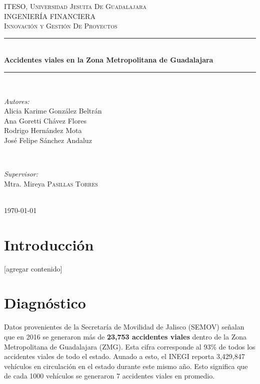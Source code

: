 \documentclass{article}
\begin{document}
\begin{titlepage}
\newcommand{\HRule}{\rule{\linewidth}{0.5mm}}

\center
\textsc{\LARGE ITESO, Universidad Jesuita De Guadalajara}\\[2cm]
\textsc{\Large INGENIERÍA FINANCIERA}\\[1cm]
\textsc{\large Innovación y Gestión De Proyectos}\\[1cm]
\HRule \\[2cm]
{ \huge \bfseries Accidentes viales en la Zona Metropolitana de Guadalajara}\\[2cm]
\HRule \\[2cm]
\begin{minipage}{0.4\textwidth}
\begin{flushleft} \large


\emph{Autores:}\\
\small Alicia Karime González Beltrán\\
\small Ana Goretti Chávez Flores\\
\small Rodrigo Hernández Mota\\
\small José Felipe Sánchez Andaluz
\end{flushleft}
\end{minipage}
~
\begin{minipage}{0.4\textwidth}
\begin{flushright} \large
\emph{Supervisor:} \\
\small Mtra. Mireya \textsc{Pasillas Torres}
\end{flushright}
\end{minipage}\\[2cm]

{\large \today}\\[1cm]

\vfill
 
\end{titlepage}
\tableofcontents
\newpage

\section{Introducción}\label{sec:into}
[agregar contenido]

\newpage
\section{Diagnóstico}\label{sec:diagnostic}

Datos provenientes de la Secretaría de Movilidad de Jalisco (SEMOV) señalan que en 2016 se generaron
más de \textbf{23,753 accidentes viales} dentro de la Zona Metropolitana de
Guadalajara (ZMG). Esta cifra corresponde al 93\% de todos los accidentes
viales de todo el estado. Aunado a esto, el INEGI reporta 3,429,847
vehículos en circulación en el estado durante este mismo año. Esto significa que de cada 1000 vehículos
se generaron 7 accidentes viales en promedio.
\end{document}
